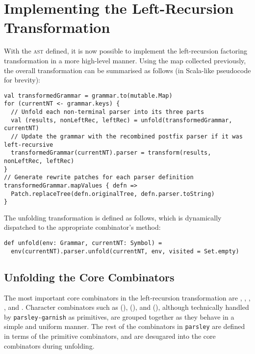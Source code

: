 \documentclass[../../main.tex]{subfiles}
\begin{document}
\section{Implementing the Left-Recursion Transformation}
With the  \textsc{ast} defined, it is now possible to implement the left-recursion factoring transformation in a more high-level manner.
Using the  map collected previously, the overall transformation can be summarised as follows (in Scala-like pseudocode for brevity):
\begin{verbatim}
val transformedGrammar = grammar.to(mutable.Map)
for (currentNT <- grammar.keys) {
  // Unfold each non-terminal parser into its three parts
  val (results, nonLeftRec, leftRec) = unfold(transformedGrammar, currentNT)
  // Update the grammar with the recombined postfix parser if it was left-recursive
  transformedGrammar(currentNT).parser = transform(results, nonLeftRec, leftRec)
}
// Generate rewrite patches for each parser definition
transformedGrammar.mapValues { defn =>
  Patch.replaceTree(defn.originalTree, defn.parser.toString)
}
\end{verbatim}
%
The unfolding transformation is defined as follows, which is dynamically dispatched to the appropriate combinator's  method:
\begin{verbatim}
def unfold(env: Grammar, currentNT: Symbol) =
  env(currentNT).parser.unfold(currentNT, env, visited = Set.empty)
\end{verbatim}

\subsection{Unfolding the Core Combinators}
The most important core combinators in the left-recursion transformation are , , , \scala{<|>}, and \scala{<*>}.
Character combinators such as  (),  (), and  (), although technically handled by \texttt{parsley-garnish} as primitives, are grouped together as they behave in a simple and uniform manner.
The rest of the combinators in \texttt{parsley} are defined in terms of the primitive combinators, and are desugared into the core combinators during unfolding.
\end{document}
